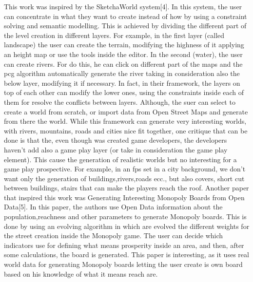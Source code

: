 \documentclass[conference]{IEEEtran}
\begin{document}
This work was inspired by the SketchaWorld system[4]. In this system, the user can concentrate in what they want to create instead of how by using a constraint solving and semantic modelling. This is achieved by dividing the different part of the level creation in different layers. For example, in the first layer (called landscape) the user can create the terrain, modifying the highness of it applying an height map or use the tools inside the editor. In the second (water), the user can create rivers. For do this, he can click on different part of the maps and the pcg algorithm automatically generate the river taking in consideration also the below layer, modifying it if necessary. In fact, in their framework, the layers on top of each other can modify the lower ones, using the constraints inside each of them for resolve the conflicts between layers. Although, the suer can select to create a world from scratch, or import data from Open Street Maps and generate from there the world. \newline
While this framework can generate very interesting worlds, with rivers, mountains, roads and cities nice fit together, one critique that can be done is that the, even though was created game developers, the developers haven't add also a game play layer (or take in consideration the game play element). This cause the generation of realistic worlds but no interesting for a game play prospective. For example, in an fps set in a city background, we don't want only the generation of buildings,rivers,roads ecc., but also covers, short cut between buildings, stairs that can make the players reach the roof. 
\newline
\newline
Another paper that inspired this work was Generating Interesting Monopoly Boards from Open Data[5]. In this paper, the authors use Open Data information about the population,reachness and other parameters to generate Monopoly boards. This is done by using an evolving algorithm in which are evolved the different weights for the street creation inside the Monopoly game. The user can decide which indicators use for defining what means prosperity inside an area, and then, after some calculations, the board is generated. This paper is interesting, as it uses real world data for generating Monopoly boards letting the user create is own board based on his knowledge of what it means reach are.
\newline
\newline
\end{document}
